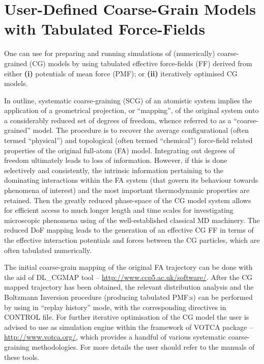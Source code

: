 \section{User-Defined Coarse-Grain Models with Tabulated Force-Fields}
\label{cg-intro}

One can use \D for preparing and running simulations of (numerically)
coarse-grained (CG) models by using tabulated effective force-fields
(FF) derived from either {\bf (i)} potentials of mean force (PMF);
or {\bf (ii)} iteratively optimised CG models.

In outline, systematic coarse-graining (SCG) of an atomistic system
implies the application of a geometrical projection, or ``mapping'',
of the original system onto a considerably reduced set of degrees of freedom,
whence referred to as a ``coarse-grained'' model.  The procedure is to recover
the average configurational (often termed ``physical'') and topological
(often termed ``chemical'') force-field related properties of the original
full-atom (FA) model.  Integrating out degrees of freedom ultimately
leads to loss of information.  However, if this is done selectively and
consistently, the intrinsic information pertaining to the dominating
interactions within the FA system (that govern its behaviour towards
phenomena of interest) and the most important thermodynamic properties
are retained.  Then the greatly reduced phase-space of the CG model system
allows for efficient access to much longer length and time scales for
investigating microscopic phenomena using of the well-established
classical MD machinery.  The reduced DoF mapping leads to the generation
of an effective CG FF in terms of the effective interaction potentials
and forces between the CG particles, which are often tabulated numerically.

The initial coarse-grain mapping of the original FA trajectory can be done
with the aid of DL\_CGMAP tool -- \href{http://www.ccp5.ac.uk/software/}
{http://www.ccp5.ac.uk/software/}. After the CG mapped trajectory
has been obtained, the relevant distribution analysis and the Boltzmann
Inversion procedure (producing tabulated PMF:s) can be performed by using \D
in ``replay history'' mode, with the corresponding directives in CONTROL file.
For further iterative optimisation of the CG model the user is advised
to use \D as simulation engine within the framework of VOTCA package --
\href{http://www.votca.org/}{http://www.votca.org/}, which
provides a handful of various systematic coarse-graining methodologies.
For more details the user should refer to the manuals of these tools.

